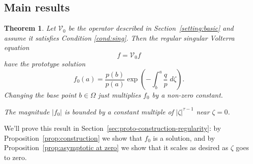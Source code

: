 \documentclass{article}
\newtheorem{defn}{Definition}
\theoremstyle{plain}
\newtheorem{thm}{Theorem}
\newcommand{\hardpart}{\mathcal{V}_0}
\newcommand{\domain}{\Omega}
\begin{document}
\subsection{Main results}\label{sec:results}
\begin{thm}\label{thm:basic_volterra}
Let $\hardpart$ be the operator described in Section~\ref{setting:basic} and assume it satisfies {\em Condition \eqref{cond:sing}}. Then the regular singular Volterra equation
\[ f = \hardpart f \]
have the {\em prototype solution}
\begin{equation}\label{eqn:test_solution}
f_0(a)=\frac{p(b)}{p(a)} \exp\left(-\int_{b}^{a}\frac{q}{p}\;d\zeta\right).
\end{equation}
Changing the base point $b \in \domain$ just multiplies $f_0$ by a non-zero constant.

The magnitude $|f_0|$ is bounded by a constant multiple of $|\zeta|^{\tau-1}$ near $\zeta = 0$.

\end{thm}
We'll prove this result in Section~\ref{sec:proto-construction-regularity}: by Proposition~\ref{prop:construction} we show that $f_0$ is a solution, and by Proposition~\ref{prop:asymptotic at zero} we show that it scales as desired as $\zeta$ goes to zero.
\end{document}
